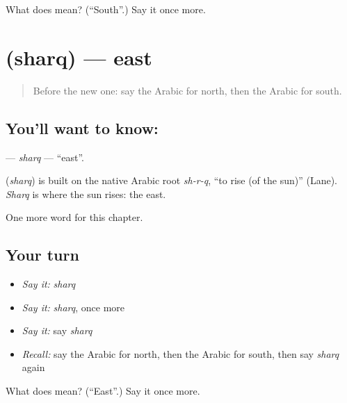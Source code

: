 \begin{tcolorbox}[breakable,colback=teal!4,colframe=teal!35!black,title={Before you move on}]
What does  mean? (\textquotedblleft{}South\textquotedblright{}.) Say it once more.
\end{tcolorbox}
\section[\texorpdfstring{\ar{شرق} (sharq)}{شرق (sharq)}]{ (sharq) — east}

\label{lesson:AR-C104-sharq}



\begin{quote}
Before the new one: say the Arabic for north, then the Arabic for south.
\end{quote}

\subsection*{You'll want to know: }
\textbf{} — \emph{sharq} — \textquotedblleft{}east\textquotedblright{}.

\begin{cousinweb}
\textbf{} (\emph{sharq}) is built on the native Arabic root \emph{sh-r-q}, \textquotedblleft{}to rise (of the sun)\textquotedblright{} (Lane). \emph{Sharq} is where the sun rises: the east.
\end{cousinweb}

\begin{grammarlens}[title={What you've built}]
One more word for this chapter.
\end{grammarlens}

\subsection*{Your turn}
\begin{itemize}
\raggedright
  \item \emph{Say it:} \emph{sharq}
  \item \emph{Say it:} \emph{sharq}, once more
  \item \emph{Say it:} say \emph{sharq}
  \item \emph{Recall:} say the Arabic for north, then the Arabic for south, then say \emph{sharq} again
\end{itemize}

\begin{tcolorbox}[breakable,colback=teal!4,colframe=teal!35!black,title={Before you move on}]
What does  mean? (\textquotedblleft{}East\textquotedblright{}.) Say it once more.
\end{tcolorbox}
